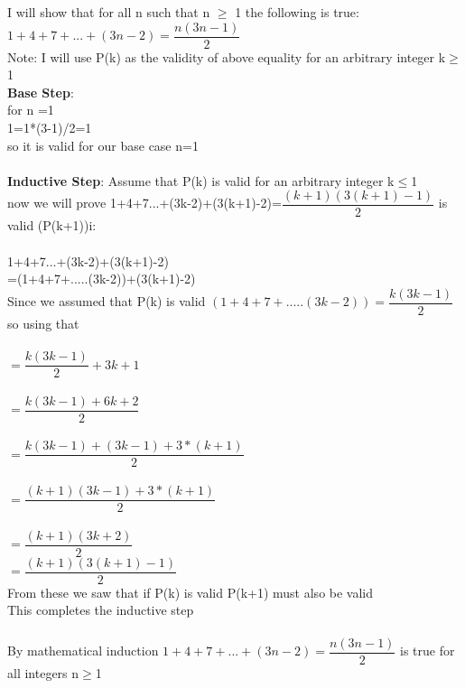 \documentclass[12pt]{article}
\begin{document}
I will show that for all n such that n $\geq$ 1 the following is true:\\
$1 + 4 + 7 + ...+ (3n-2) = \dfrac{n(3n-1)}{2}$\\
Note: I will use P(k) as the validity of above equality for an arbitrary integer k$\geq$1
\\
\textbf{Base Step}:\\
for n =1\\
1=1*(3-1)/2=1\\
so it is valid for our base case n=1\\
\\
\textbf{Inductive Step}: Assume that P(k) is valid for an arbitrary integer k$\leq$1 \\
now we will prove 1+4+7...+(3k-2)+(3(k+1)-2)=$\dfrac{(k+1)(3(k+1)-1)}{2}$ is valid (P(k+1))i:\\
\\
1+4+7...+(3k-2)+(3(k+1)-2)\\
=(1+4+7+.....(3k-2))+(3(k+1)-2)\\
Since we assumed that P(k) is valid $(1+4+7+.....(3k-2))=\dfrac{k(3k-1)}{2}$ so using that\\
\\
$=\dfrac{k(3k-1)}{2}+3k+1$\\
\\
$=\dfrac{k(3k-1)+6k+2}{2}$\\
\\
$=\dfrac{k(3k-1)+(3k-1)+3*(k+1)}{2}$\\
\\
$=\dfrac{(k+1)(3k-1)+3*(k+1)}{2}$\\
\\
$=\dfrac{(k+1)(3k+2)}{2}$\\
$=\dfrac{(k+1)(3(k+1)-1)}{2}$\\
From these we saw that if P(k) is valid P(k+1) must also be valid\\
This completes the inductive step\\
\\
By mathematical induction $1 + 4 + 7 + ...+ (3n-2) = \dfrac{n(3n-1)}{2}$ is true for all integers n$\geq$1
\end{document}
